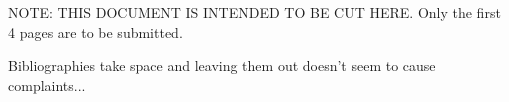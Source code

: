 \documentclass[11pt,preprint]{aastex_nofoot}
\begin{document}
\clearpage

NOTE: THIS DOCUMENT IS INTENDED TO BE CUT HERE.  Only the first 4 pages are to be submitted.


% 
% 
% 



\clearpage
{\color{red} Bibliographies take space and leaving them out doesn't seem to cause complaints...}
\footnotesize\raggedright
\noindent 

\normalsize
%
\end{document}
